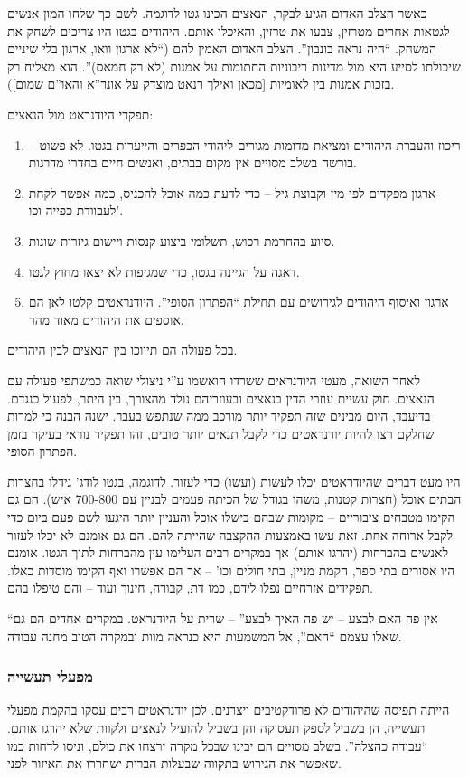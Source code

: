 \documentclass[a4paper]{book}
\begin{document}
	כאשר הצלב האדום הגיע לבקר, הנאצים הכינו גטו לדוגמה. לשם כך שלחו המון אנשים לגטאות אחרים מטרזין, צבעו את טרזין, והאיכלו אותם. היהודים בגטו היו צריכים לשחק את המשחק. ``היה נראה בונבון''. הצלב האדום האמין להם (``לא ארגון וואו, ארגון בלי שיניים שיכולתו לסייע היא מול מדינות ריבוניות החתומות על אמנות (לא רק חמאס)''. הוא מצליח רק בזכות אמנות בין לאומיות [מכאן ואילך רנאט מוצדק על אונר''א והאו''ם שמום]). 
	
	תפקדי היודנראט מול הנאצים: 
	\begin{enumerate}
		\item ריכוז והעברת היהודים ומציאת מדומות מגורים ליהודי הכפרים והייערות בגטו. לא פשוט – בורשה בשלב מסויים אין מקום בבתים, ואנשים חיים בחדרי מדרגות. 
		\item ארגון מפקדים לפי מין וקבוצת גיל – כדי לדעת כמה אוכל להכניס, כמה אפשר לקחת לעבוודת כפייה וכו'. 
		\item סיוע בהחרמת רכוש, תשלומי ביצוע קנסות ויישום גיזרות שונות. 
		\item דאגה על הגיינה בגטו, כדי שמגיפות לא יצאו מחוץ לגטו. 
		\item ארגון ואיסוף היהודים לגירושים עם תחילת ``הפתרון הסופי''. היודנראטים קלטו לאן הם אוספים את היהודים מאוד מהר. 
	\end{enumerate}
	בכל פעולה הם תיווכו בין הנאצים לבין היהודים. 
	
	לאחר השואה, מעטי היודנראים ששרדו הואשמו ע''י ניצולי שואה כמשתפי פעולה עם הנאצים. חוק עשיית עוזרי הדין בנאצים ובעוזריהם נולד מהצורך, בין היתר, לפעול כנגדם. בדיעבד, היום מבינים שזה תפקיד יותר מורכב ממה שנתפש בעבר. ישנה הבנה כי למרות שחלקם רצו להיות יודנראטים כדי לקבל תנאים יותר טובים, זהו תפקיד נוראי בעיקר בזמן הפתרון הסופי. 
	
	היו מעט דברים שהיודראטים יכלו לעשות (ועשו) כדי לעזור. לדוגמה, בגטו לודג' גידלו בחצרות הבתים אוכל (חצרות קטנות, משהו בגודל של הכיתה פעמים לבניין עם 700-800 איש). הם גם הקימו מטבחים ציבוריים – מקומות שבהם בישלו אוכל והעניין יותר היגעו לשם פעם ביום כדי לקבל ארוחה אחת. זאת עשו באמצעות ההקצבה שהייתה להם. הם גם אומנם לא יכלו לעזור לאנשים בהברחות (יהרגו אותם) אך במקרים רבים העלימו עין מהברחות לתוך הגטו. אומנם היו אסורים בתי ספר, הקמת מניין, בתי חולים וכו' – אך הם אפשרו ואף הקימו מוסדות כאלו. תפקידים אזרחיים נפלו לידם, כמו דת, קבורה, חינוך ועוד – והם טיפלו בהם. 
	
	``אין פה האם לבצע – יש פה האיך לבצע'' – שרית על היודנראט. במקרים אחדים הם גם שאלו עצמם ``האם'', אל המשמעות היא כנראה מוות ובמקרה הטוב מחנה עבודה. 
	
	\subsubsection{מפעלי תעשייה}
	הייתה תפיסה שהיהודים לא פרודקטיבים ויצרנים. לכן יודנראטים רבים עסקו בהקמת מפעלי תעשייה, הן בשביל לספק תעסוקה והן בשביל להועיל לנאצים ולקוות שלא יהרגו אותם. ``עבודה כהצלה''. בשלב מסויים הם יבינו שבכל מקרה ירצחו את כולם, וניסו לדחות כמו שאפשר את הגירוש בתקווה שבעלות הברית ישחררו את האיזור לפני. 
	
\end{document}
